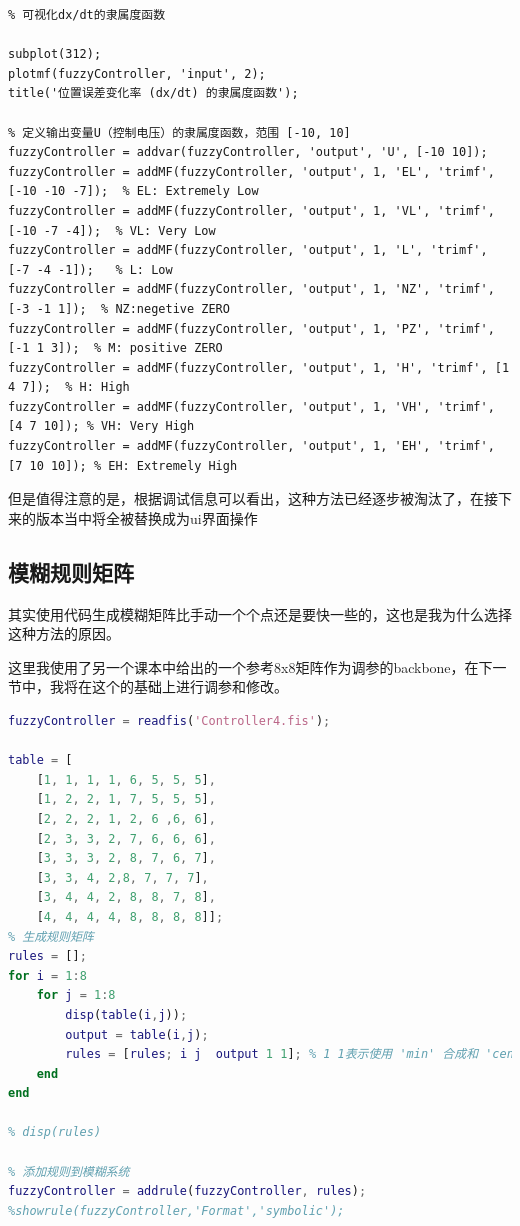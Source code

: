 \documentclass[12pt,a4paper,UTF8]{article}
\begin{document}
\begin{lstlisting}
% 可视化dx/dt的隶属度函数

subplot(312);
plotmf(fuzzyController, 'input', 2);
title('位置误差变化率 (dx/dt) 的隶属度函数');

% 定义输出变量U（控制电压）的隶属度函数，范围 [-10, 10]
fuzzyController = addvar(fuzzyController, 'output', 'U', [-10 10]);
fuzzyController = addMF(fuzzyController, 'output', 1, 'EL', 'trimf', [-10 -10 -7]);  % EL: Extremely Low
fuzzyController = addMF(fuzzyController, 'output', 1, 'VL', 'trimf', [-10 -7 -4]);  % VL: Very Low
fuzzyController = addMF(fuzzyController, 'output', 1, 'L', 'trimf', [-7 -4 -1]);   % L: Low
fuzzyController = addMF(fuzzyController, 'output', 1, 'NZ', 'trimf', [-3 -1 1]);  % NZ:negetive ZERO
fuzzyController = addMF(fuzzyController, 'output', 1, 'PZ', 'trimf', [-1 1 3]);  % M: positive ZERO
fuzzyController = addMF(fuzzyController, 'output', 1, 'H', 'trimf', [1 4 7]);  % H: High
fuzzyController = addMF(fuzzyController, 'output', 1, 'VH', 'trimf', [4 7 10]); % VH: Very High
fuzzyController = addMF(fuzzyController, 'output', 1, 'EH', 'trimf', [7 10 10]); % EH: Extremely High
\end{lstlisting}

但是值得注意的是，根据调试信息可以看出，这种方法已经逐步被淘汰了，在接下来的版本当中将全被替换成为ui界面操作

\subsection{模糊规则矩阵}
其实使用代码生成模糊矩阵比手动一个个点还是要快一些的，这也是我为什么选择这种方法的原因。


这里我使用了另一个课本中给出的一个参考8x8矩阵作为调参的backbone，在下一节中，我将在这个的基础上进行调参和修改。


\begin{lstlisting}[language=Matlab,caption=生成规则矩阵]
fuzzyController = readfis('Controller4.fis');

table = [
    [1, 1, 1, 1, 6, 5, 5, 5],
    [1, 2, 2, 1, 7, 5, 5, 5],
    [2, 2, 2, 1, 2, 6 ,6, 6],
    [2, 3, 3, 2, 7, 6, 6, 6],
    [3, 3, 3, 2, 8, 7, 6, 7],
    [3, 3, 4, 2,8, 7, 7, 7],
    [3, 4, 4, 2, 8, 8, 7, 8],
    [4, 4, 4, 4, 8, 8, 8, 8]];
% 生成规则矩阵
rules = [];
for i = 1:8
    for j = 1:8
        disp(table(i,j));
        output = table(i,j);
        rules = [rules; i j  output 1 1]; % 1 1表示使用 'min' 合成和 'centroid' 解模糊
    end
end

% disp(rules)

% 添加规则到模糊系统
fuzzyController = addrule(fuzzyController, rules);
%showrule(fuzzyController,'Format','symbolic');
\end{lstlisting}
\end{document}
